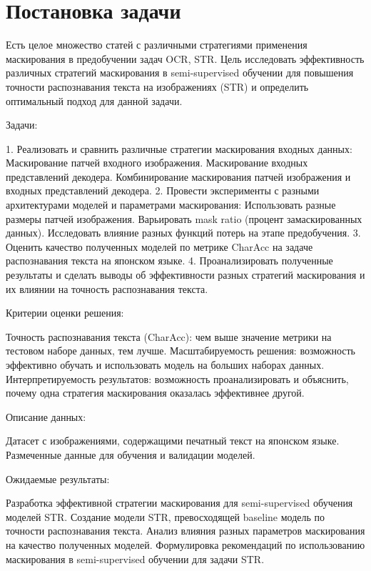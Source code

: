 \section{Постановка задачи}
\label{sec:Chapter1} 

Есть целое множество статей с различными стратегиями применения маскирования в предобучении задач OCR, STR.
Цель исследовать эффективность  различных стратегий маскирования  в  semi-supervised обучении для повышения точности распознавания текста на изображениях (STR)  и определить оптимальный подход для  данной задачи.

Задачи:

1. Реализовать и сравнить  различные  стратегии  маскирования  входных данных:
    Маскирование патчей входного изображения.
    Маскирование входных представлений декодера.
    Комбинирование  маскирования  патчей  изображения  и  входных  представлений  декодера.
2. Провести  эксперименты  с  разными  архитектурами  моделей  и  параметрами  маскирования:
    Использовать  разные  размеры  патчей  изображения.
    Варьировать  mask ratio  (процент  замаскированных  данных).
    Исследовать  влияние  разных  функций  потерь  на  этапе  предобучения.
3. Оценить  качество  полученных  моделей  по  метрике  CharAcc  на  задаче  распознавания  текста  на  японском языке.
4. Проанализировать  полученные  результаты  и  сделать  выводы  об  эффективности  разных  стратегий  маскирования  и  их  влиянии  на  точность  распознавания  текста.

Критерии оценки решения:

Точность  распознавания  текста (CharAcc):  чем  выше  значение  метрики  на  тестовом  наборе  данных,  тем  лучше.
Масштабируемость  решения:  возможность  эффективно  обучать  и  использовать  модель  на  больших  наборах  данных.
Интерпретируемость  результатов:  возможность  проанализировать  и  объяснить,  почему  одна  стратегия  маскирования  оказалась  эффективнее  другой.

Описание  данных:

Датасет  с  изображениями,  содержащими  печатный  текст  на  японском  языке.
Размеченные  данные  для  обучения  и  валидации  моделей.

Ожидаемые  результаты:

Разработка  эффективной  стратегии  маскирования  для  semi-supervised  обучения  моделей  STR.
Создание  модели  STR,  превосходящей  baseline  модель  по  точности  распознавания  текста.
Анализ  влияния  разных  параметров  маскирования  на  качество  полученных  моделей.
Формулировка  рекомендаций  по  использованию  маскирования  в  semi-supervised  обучении  для  задачи  STR.



\newpage
